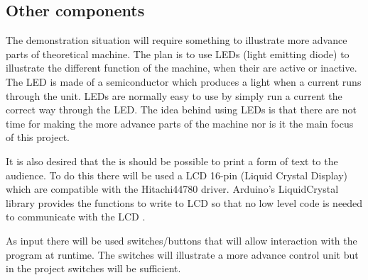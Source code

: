 \subsection{Other components}
The demonstration situation will require something to illustrate more advance parts of theoretical machine. The plan is to use LEDs (light emitting diode) to illustrate the different function of the machine, when their are active or inactive. The LED is made of a semiconductor which produces a light when a current runs through the unit. LEDs are normally easy to use by simply run a current the correct way through the LED.
The idea behind using LEDs is that there are not time for making the more advance parts of the machine nor is it the main focus of this project.

It is also desired that the is should be possible to print a form of text to the audience. To do this there will be used a LCD 16-pin (Liquid Crystal Display) which are compatible with the Hitachi44780 driver. Arduino's LiquidCrystal library provides the functions to write to LCD so that no low level code is needed to communicate with the LCD \citep{ArduinoLCD}.

As input there will be used switches/buttons that will allow interaction with the program at runtime. The switches will illustrate a more advance control unit but in the project switches will be sufficient.